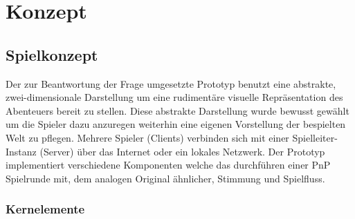 \chapter{Konzept}
\label{concept}


\section{Spielkonzept}
\label{sec:Grobkonzept}
Der zur Beantwortung der Frage umgesetzte Prototyp benutzt eine abstrakte, zwei-dimensionale Darstellung um eine rudimentäre visuelle Repräsentation des Abenteuers bereit zu stellen. Diese abstrakte Darstellung wurde bewusst gewählt um die Spieler dazu anzuregen weiterhin eine eigenen Vorstellung der bespielten Welt zu pflegen. Mehrere Spieler (Clients) verbinden sich mit einer Spielleiter-Instanz (Server) über das Internet oder ein lokales Netzwerk. Der Prototyp implementiert verschiedene Komponenten welche das durchführen einer PnP Spielrunde mit, dem analogen Original ähnlicher, Stimmung und Spielfluss.



\subsection{Kernelemente}


